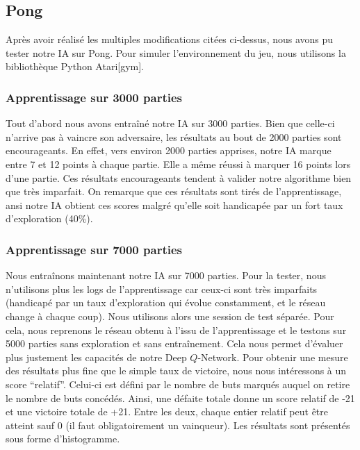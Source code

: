 \subsection{Pong}

Après avoir réalisé les multiples modifications citées ci-dessus, nous avons pu tester notre IA sur Pong. Pour simuler l'environnement du jeu, nous utilisons
la bibliothèque Python Atari[gym].

\subsubsection{Apprentissage sur 3000 parties}

Tout d'abord nous avons entraîné notre IA sur 3000 parties. Bien que celle-ci n'arrive pas à vaincre son adversaire, les résultats au bout de 2000 parties sont
encourageants. En effet, vers environ 2000 parties apprises, notre IA marque entre 7 et 12 points à chaque partie. Elle a même réussi à marquer 16 points lors d'une
partie. Ces résultats encourageants tendent à valider notre algorithme bien que très imparfait. On remarque que ces résultats sont tirés de l'apprentissage, 
ansi notre IA obtient ces scores malgré qu'elle soit handicapée par un fort taux d'exploration (40\%).

\subsubsection{Apprentissage sur 7000 parties}

Nous entraînons maintenant notre IA sur 7000 parties. Pour la tester, nous n'utilisons plus les logs de l'apprentissage car ceux-ci sont très imparfaits (handicapé par 
un taux d'exploration qui évolue constamment, et le réseau change à chaque coup). Nous utilisons alors une session de test séparée. Pour cela, nous reprenons le réseau
obtenu à l'issu de l'apprentissage et le testons sur 5000 parties sans exploration et sans entraînement. Cela nous permet d'évaluer plus justement les capacités
de notre Deep $Q$-Network. Pour obtenir une mesure des résultats plus fine que le simple taux de victoire, nous nous intéressons à un score ``relatif''. Celui-ci 
est défini par le nombre de buts marqués auquel on retire le nombre de buts concédés. Ainsi, une défaite totale donne un score relatif de -21 et une victoire totale 
de +21. Entre les deux, chaque entier relatif peut être atteint sauf 0 (il faut obligatoirement un vainqueur). Les résultats sont présentés sous forme d'histogramme.

